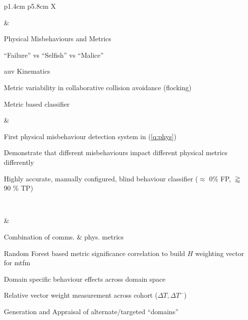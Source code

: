 \begin{table}
{\begin{tabularx}{\textwidth}{p{1.4cm} p{5.8cm} X}
			\begin{minipage}[t][][b]{\linewidth}\end{minipage}
			& \begin{minipage}[t]{\linewidth}
				\begin{tightimize} 
					\item Physical Misbehaviours and Metrics
					\item ``Failure'' vs ``Selfish'' vs ``Malice''
					\item \gls{auv} Kinematics
					\item Metric variability in collaborative collision avoidance (flocking)
					\item Metric based classifier
				\end{tightimize}
			\end{minipage}
			& \begin{minipage}[t]{\linewidth}
				\begin{tightimize} 
					\item First physical misbehaviour detection system in \label{uan} (\autoref{q:phys})
					\item Demonstrate that different misbehaviours impact different physical metrics differently %
					\item Highly accurate, manually configured, blind behaviour classifier ($\approx$ 0\% FP, $\gtrapprox$ 90 \% TP)
				\end{tightimize}
			\end{minipage}\\\midrule
			\begin{minipage}[t][][b]{\linewidth}\end{minipage}
			& \begin{minipage}[t]{\linewidth}
				\begin{tightimize} 
					\item Combination of comms. \& phys. metrics
					\item Random Forest based metric significance correlation to build $H$ weighting vector for \gls{mtfm}
					\item Domain specific behaviour effects across domain space
					\item Relative vector weight measurement across cohort ($\Delta T, \Delta T^-$)
					\item Generation and Appraisal of alternate/targeted ``domains''
				\end{tightimize}

\end{minipage}
\end{tabularx}}
\end{table}
